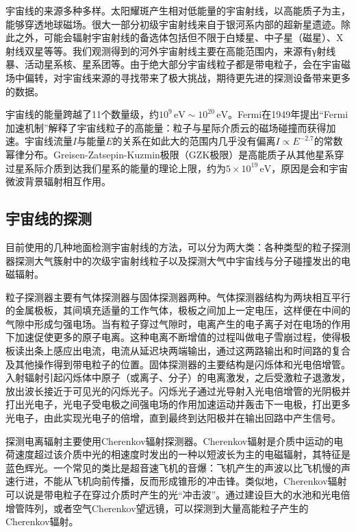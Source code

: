 \documentclass[fontset=none,zihao=-4]{ctexart}
\begin{document}
宇宙线的来源多种多样。太阳耀斑产生相对低能量的宇宙射线，以高能质子为主，能够穿透地球磁场。很大一部分初级宇宙射线来自于银河系内部的超新星遗迹。除此之外，可能会辐射宇宙射线的备选体包括但不限于白矮星、中子星（磁星）、X射线双星等等。我们观测得到的河外宇宙射线主要在高能范围内，来源有γ射线暴、活动星系核、星系团等。由于绝大部分宇宙线粒子都是带电粒子，会在宇宙磁场中偏转，对宇宙线来源的寻找带来了极大挑战，期待更先进的探测设备带来更多的数据。

宇宙线的能量跨越了11个数量级，约$10^9\,\mathrm{eV} \sim 10^{20}\,\mathrm{eV}$。Fermi在1949年提出“Fermi加速机制”解释了宇宙线粒子的高能量：粒子与星际介质云的磁场碰撞而获得加速。宇宙线流量$I$与能量$E$的关系在如此大的范围内几乎没有偏离$I \propto E^{-2.7}$的常数幂律分布。Greisen-Zatsepin-Kuzmin极限（GZK极限）是高能质子从其他星系穿过星系际介质到达我们星系的能量的理论上限，约为$5 \times 10^{19}\,\mathrm{eV}$，原因是会和宇宙微波背景辐射相互作用。

\subsection{宇宙线的探测}

目前使用的几种地面检测宇宙射线的方法，可以分为两大类：各种类型的粒子探测器探测大气簇射中的次级宇宙射线粒子以及探测大气中宇宙线与分子碰撞发出的电磁辐射。

粒子探测器主要有气体探测器与固体探测器两种。气体探测器结构为两块相互平行的金属极板，其间填充适量的工作气体，极板之间加上一定电压，这样便在中间的气隙中形成匀强电场。当有粒子穿过气隙时，电离产生的电子离子对在电场的作用下加速促使更多的原子电离。这种电离不断增值的过程叫做电子雪崩过程，使得极板读出条上感应出电流，电流从延迟块两端输出，通过这两路输出和时间路的复合及其他操作得到带电粒子的位置。固体探测器的主要结构是闪烁体和光电倍增管。入射辐射引起闪烁体中原子（或离子、分子）的电离激发，之后受激粒子退激发，放出波长接近于可见光的闪烁光子。闪烁光子通过光导射入光电倍增管的光阴极并打出光电子，光电子受电极之间强电场的作用加速运动并轰击下一电极，打出更多光电子，由此实现光电子的倍增，直到最终到达阳极并在输出回路中产生信号。

探测电离辐射主要使用Cherenkov辐射探测器。Cherenkov辐射是介质中运动的电荷速度超过该介质中光的相速度时发出的一种以短波长为主的电磁辐射，其特征是蓝色辉光。一个常见的类比是超音速飞机的音爆：飞机产生的声波以比飞机慢的声速行进，不能从飞机向前传播，反而形成锥形的冲击锋。类似地，Cherenkov辐射可以说是带电粒子在穿过介质时产生的光“冲击波”。通过建设巨大的水池和光电倍增管阵列，或者空气Cherenkov望远镜，可以探测到大量高能粒子产生的Cherenkov辐射。
\end{document}

